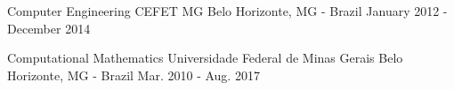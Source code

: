 

\begin{cventries}

  \cventry
    {Computer Engineering} %
    {CEFET MG} %
    {Belo Horizonte, MG - Brazil} %
    {January 2012 - December 2014} %
    {
      \begin{cvitems} %
      \end{cvitems}
    }

    \cventry
    {Computational Mathematics} %
    {Universidade Federal de Minas Gerais} %
    {Belo Horizonte, MG - Brazil} %
    {Mar. 2010 - Aug. 2017} %
    {
      \begin{cvitems} %
      \end{cvitems}
    }

\end{cventries}

